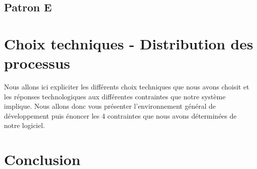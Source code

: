 \subsection{Patron E}


\section{Choix techniques - Distribution des processus}

\indent Nous allons ici expliciter les différents choix techniques que nous avons choisit et les réponses technologiques aux différentes contraintes que notre système implique. Nous allons donc vous présenter l'environnement général de développement puis énoncer les 4 contraintes que nous avons déterminées de notre logiciel.

%
%



\section{Conclusion}

